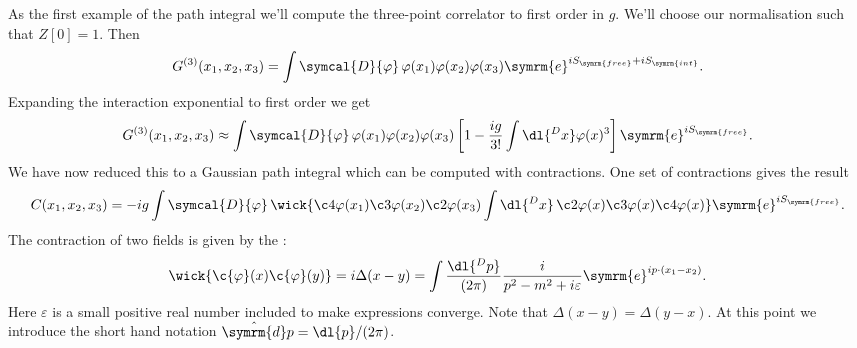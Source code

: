 \documentclass[fleqn]{NotesClass}
\newcommand{\e}{\symrm{e}}
\newcommand{\interaction}{{\symrm{int}}}
\newcommand{\DL}[1]{\symcal{D}{#1}}
\newcommand{\dhat}[1]{\hat{\symrm{d}}{#1}}
\begin{document}
    As the first example of the path integral we'll compute the three-point correlator to first order in \(g\).
    We'll choose our normalisation such that \(Z[0] = 1\).
    Then
    \begin{equation}
        G^{(3)}(x_1, x_2, x_3) = \int \DL{\varphi} \, \varphi(x_1) \varphi(x_2) \varphi(x_3) \e^{iS_{\symrm{free}} + iS_{\interaction}}.
    \end{equation}
    Expanding the interaction exponential to first order we get
    \begin{equation}
        G^{(3)}(x_1, x_2, x_3) \approx \int \DL{\varphi} \, \varphi(x_1) \varphi(x_2) \varphi(x_3) \left[ 1 - \frac{ig}{3!} \int \dl{^Dx} \varphi(x)^3 \right] \e^{iS_{\symrm{free}}}.
    \end{equation}
    We have now reduced this to a Gaussian path integral which can be computed with contractions.
    One set of contractions gives the result
    \begin{equation}
        C(x_1, x_2, x_3) = -ig \int \DL{\varphi} \, \wick{\c4{\varphi}(x_1) \c3{\varphi}(x_2) \c2{\varphi}(x_3) \int \dl{^Dx} \, \c2{\varphi}(x) \c3{\varphi}(x) \c4{\varphi}(x)} \e^{iS_{\symrm{free}}}.
    \end{equation}
    The contraction of two fields is given by the :
    \begin{equation}
        \wick{\c{\varphi}(x)\c{\varphi}(y)} = i\Delta(x - y) = \int \frac{\dl{^Dp}}{(2\pi)} \frac{i}{p^2 - m^2 + i\varepsilon} \e^{ip \cdot (x_1 - x_2)}.
    \end{equation}
    Here \(\varepsilon\) is a small positive real number included to make expressions converge.
    Note that \(\Delta(x - y) = \Delta(y - x)\).
    At this point we introduce the short hand notation \(\dhat{p} = \dl{p}/(2\pi)\).
    
\end{document}
